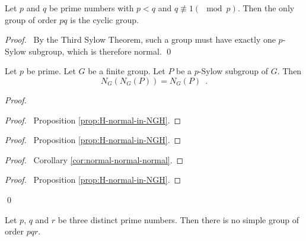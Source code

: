 \begin{cor}
Let $p$ and $q$ be prime numbers with $p < q$ and $q \not\equiv 1 (\mod p)$. Then the only group of order $pq$ is the cyclic group.
\end{cor}

\begin{proof}
\pf\ By the Third Sylow Theorem, such a group must have exactly one $p$-Sylow subgroup, which is therefore normal. \qed
\end{proof}

\begin{prop}
\label{prop:NG-NG}
Let $p$ be prime. Let $G$ be a finite group. Let $P$ be a $p$-Sylow subgroup of $G$. Then
\[ N_G(N_G(P)) = N_G(P) \enspace . \]
\end{prop}

\begin{proof}
\pf
{}
\begin{proof}
	\pf\ Proposition \ref{prop:H-normal-in-NGH}.
\end{proof}
\begin{proof}
	\pf\ Proposition \ref{prop:H-normal-in-NGH}.
\end{proof}
\begin{proof}
	\pf\ Corollary \ref{cor:normal-normal-normal}.
\end{proof}
\begin{proof}
	\pf\ Proposition \ref{prop:H-normal-in-NGH}.
\end{proof}
\qed
\end{proof}

\begin{prop}
\label{prop:pqr-not-simple}
Let $p$, $q$ and $r$ be three distinct prime numbers.	Then there is no simple group of order $pqr$.
\end{prop}

